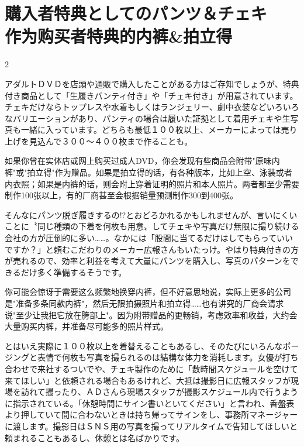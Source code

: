 \documentclass[12pt,UTF8]{ctexbook}
\begin{document}
\section{購入者特典としてのパンツ＆チェキ\\作为购买者特典的内裤\&拍立得}

\begin{paracol}{2}

アダルトＤＶＤを店頭や通販で購入したことがある方はご存知でしょうが、特典付き商品として「生履きパンティ付き」や「チェキ付き」が用意されています。チェキだけならトップレスや水着もしくはランジェリー、劇中衣装などいろいろなバリエーションがあり、パンティの場合は履いた証拠として着用チェキや生写真も一緒に入っています。どちらも最低１００枚以上、メーカーによっては売り上げを見込んで３００〜４００枚まで作ることも。

\switchcolumn

如果你曾在实体店或网上购买过成人DVD，你会发现有些商品会附带"原味内裤"或"拍立得"作为赠品。如果是拍立得的话，有各种版本，比如上空、泳装或者内衣照；如果是内裤的话，则会附上穿着证明的照片和本人照片。两者都至少需要制作100张以上，有的厂商甚至会根据销量预测制作300到400张。

\switchcolumn*

そんなにパンツ脱ぎ履きするの!?とおどろかれるかもしれませんが、言いにくいことに〝同じ種類の下着を何枚も用意〟してチェキや写真だけ無限に撮り続ける会社の方が圧倒的に多い……。なかには「股間に当てるだけはしてもらっていいですか？」と頼むこだわりのメーカー広報さんもいたっけ。やはり特典付きの方が売れるので、効率と利益を考えて大量にパンツを購入し、写真のパターンをできるだけ多く準備するそうです。

\switchcolumn

你可能会惊讶于需要这么频繁地换穿内裤，但不好意思地说，实际上更多的公司是"准备多条同款内裤"，然后无限拍摄照片和拍立得……也有讲究的厂商会请求说"至少让我把它放在胯部上"。因为附带赠品的更畅销，考虑效率和收益，大约会大量购买内裤，并准备尽可能多的照片样式。

\switchcolumn*

とはいえ実際に１００枚以上を着替えることもあるし、そのたびにいろんなポージングと表情で何枚も写真を撮られるのは結構な体力を消耗します。女優が打ち合わせで来社するついでや、チェキ製作のために「数時間スケジュールを空けて来てほしい」と依頼される場合もあるけれど、大抵は撮影日に広報スタッフが現場を訪れて撮ったり、ＡＤさんら現場スタッフが撮影スケジュール内で行うように指示されている。「休憩時間にサイン書いといてください」と言われ、香盤表より押していて間に合わないときは持ち帰ってサインをし、事務所マネージャーに渡します。撮影日はＳＮＳ用の写真を撮ってリアルタイムで告知してほしいと頼まれることもあるし、休憩とは名ばかりです。


\end{paracol}
\end{document}
